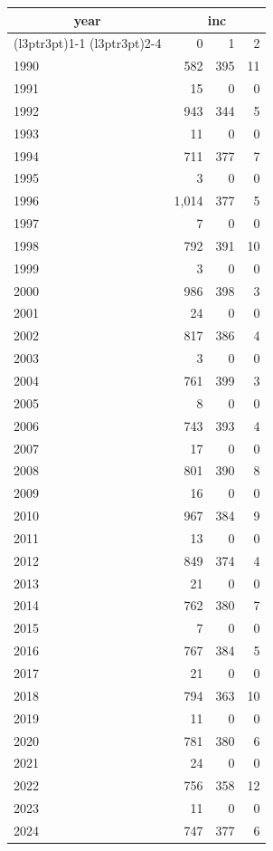 \footnotesize\begin{tabular}[t]{lrrr}
\toprule
\multicolumn{1}{c}{year} & \multicolumn{3}{c}{inc} \\
\cmidrule(l{3pt}r{3pt}){1-1} \cmidrule(l{3pt}r{3pt}){2-4}
  & 0 & 1 & 2\\
\midrule
1990 & 582 & 395 & 11\\
1991 & 15 & 0 & 0\\
1992 & 943 & 344 & 5\\
1993 & 11 & 0 & 0\\
1994 & 711 & 377 & 7\\
1995 & 3 & 0 & 0\\
1996 & 1,014 & 377 & 5\\
1997 & 7 & 0 & 0\\
1998 & 792 & 391 & 10\\
1999 & 3 & 0 & 0\\
2000 & 986 & 398 & 3\\
2001 & 24 & 0 & 0\\
2002 & 817 & 386 & 4\\
2003 & 3 & 0 & 0\\
2004 & 761 & 399 & 3\\
2005 & 8 & 0 & 0\\
2006 & 743 & 393 & 4\\
2007 & 17 & 0 & 0\\
2008 & 801 & 390 & 8\\
2009 & 16 & 0 & 0\\
2010 & 967 & 384 & 9\\
2011 & 13 & 0 & 0\\
2012 & 849 & 374 & 4\\
2013 & 21 & 0 & 0\\
2014 & 762 & 380 & 7\\
2015 & 7 & 0 & 0\\
2016 & 767 & 384 & 5\\
2017 & 21 & 0 & 0\\
2018 & 794 & 363 & 10\\
2019 & 11 & 0 & 0\\
2020 & 781 & 380 & 6\\
2021 & 24 & 0 & 0\\
2022 & 756 & 358 & 12\\
2023 & 11 & 0 & 0\\
2024 & 747 & 377 & 6\\
\bottomrule
\end{tabular}
